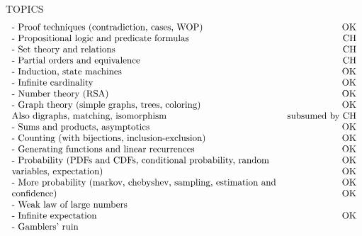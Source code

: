 \documentclass[quiz]{mcs}
\renewcommand{\examspace}[]{}
\begin{document}
\final

\begin{editingnotes}
TOPICS
\[\begin{tabular}{lr}
- Proof techniques (contradiction, cases, WOP)    &               OK\\
- Propositional logic and predicate formulas       &         CH\\
- Set theory and relations                          &        CH\\
- Partial orders and equivalence                     &       CH\\
- Induction, state machines                           &           OK\\
- Infinite cardinality                                 &          OK\\
- Number theory (RSA)                                   &         OK\\
- Graph theory (simple graphs, trees, coloring)          &        OK\\
    Also digraphs, matching, isomorphism            & subsumed by CH\\
- Sums and products, asymptotics         &                        OK\\
- Counting (with bijections, inclusion-exclusion)  &              OK\\
- Generating functions and linear recurrences       &             OK\\
- Probability (PDFs and CDFs, conditional probability, random &   OK\\
    variables, expectation)                                    &  OK\\
- More probability (markov, chebyshev, sampling, estimation and & OK\\
    confidence)                                               &   OK\\
- Weak law of large numbers\\
- Infinite expectation                                         &  OK\\
- Gamblers' ruin
\end{tabular}\]\end{editingnotes}


\examspace
{}
\end{document}
